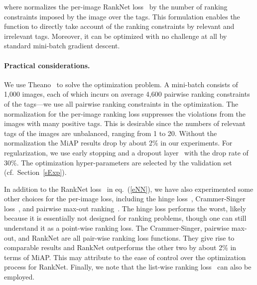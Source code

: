 \documentclass[10pt,twocolumn,letterpaper]{article}
\begin{document}
where  normalizes the per-image RankNet loss~\cite{burges_learning_2005}   by the number of ranking constraints  imposed by the image  over the tags. This formulation enables the function  to directly  take account of the ranking constraints by relevant  and irrelevant  tags. Moreover, it can be optimized with no challenge at all by standard mini-batch gradient descent.
\vspace{-11pt}





\paragraph{Practical considerations.}
We use Theano~\cite{bergstra_theano:_2010} to solve the optimization problem. A mini-batch consists of 1,000 images, each of which incurs on average 4,600 pairwise ranking constraints of the tags---we use all pairwise ranking constraints in the optimization. The normalization  for the per-image ranking loss suppresses the violations from the images with many positive tags. This is desirable since the numbers of relevant tags of the images are unbalanced, ranging from 1 to 20. Without the normalization the MiAP results drop by about 2\% in our experiments. For regularization, we use early stopping and a dropout layer~\cite{hinton_improving_2012} with the drop rate of 30\%. The optimization hyper-parameters are selected by the validation set (cf.\ Section~\ref{sExp}).

In addition to the RankNet loss~\cite{burges_learning_2005} in eq.~(\ref{eNN}), we have also experimented some other choices for the per-image loss, including the hinge loss~\cite{cortes_support-vector_1995}, Crammer-Singer loss~\cite{crammer_algorithmic_2002}, and pairwise max-out ranking~\cite{joachims_optimizing_2002}. The hinge loss performs the worst, likely because it is essentially not designed for ranking problems, though one can still understand it as a point-wise ranking loss. The Crammer-Singer, pairwise max-out, and RankNet are all pair-wise ranking loss functions. They give rise to comparable results and RankNet outperforms the other two by about 2\% in terms of MiAP. This  may attribute to the ease of control over the optimization process for RankNet. Finally, we note that the list-wise ranking loss~\cite{xia_listwise_2008} can also be employed.
\end{document}
